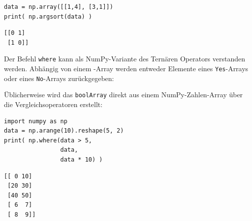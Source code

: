 \begin{tcbraster}[raster columns=2,
                  raster equal height,
                  nobeforeafter,
                  raster column skip=0.5cm]
\begin{codebox}
\begin{verbatim}
data = np.array([[1,4], [3,1]])
print( np.argsort(data) )
\end{verbatim}
\end{codebox}
%
\begin{cmdbox}
\begin{verbatim}
[[0 1]
 [1 0]]
\end{verbatim}
\end{cmdbox}
\end{tcbraster}

Der Befehl \texttt{where} kann als NumPy-Variante des Ternären Operators verstanden werden. Abhängig von einem -Array werden entweder Elemente eines \texttt{Yes}-Arrays oder eines \texttt{No}-Arrays zurückgegeben:
\begin{center}
\end{center}

Üblicherweise wird das \texttt{boolArray} direkt aus einem NumPy-Zahlen-Array über die Vergleichsoperatoren erstellt:

\begin{tcbraster}[raster columns=2,
                  raster equal height,
                  nobeforeafter,
                  raster column skip=0.5cm]
\begin{codebox}
\begin{verbatim}
import numpy as np
data = np.arange(10).reshape(5, 2)
print( np.where(data > 5,
                data,
                data * 10) )
\end{verbatim}
\end{codebox}
%
\begin{cmdbox}
\begin{verbatim}
[[ 0 10]
 [20 30]
 [40 50]
 [ 6  7]
 [ 8  9]]
\end{verbatim}
\end{cmdbox}
\end{tcbraster}

